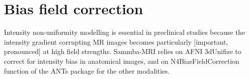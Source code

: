 \documentclass[utf8]{frontiersSCNS} %
\begin{document}
\section{Bias field correction}
Intensity non-uniformity modelling is essential in preclinical studies
because the intensity gradient corrupting MR images becomes
particularly [important, pronounced] at high field strengths.
Sammba-MRI relies on AFNI 3dUnifize to correct for intensity bias in
anatomical images, and on N4BiasFieldCorrection function
of the ANTs package \citep{tustison2010n4itk}
for the other modalities.
%
\end{document}
